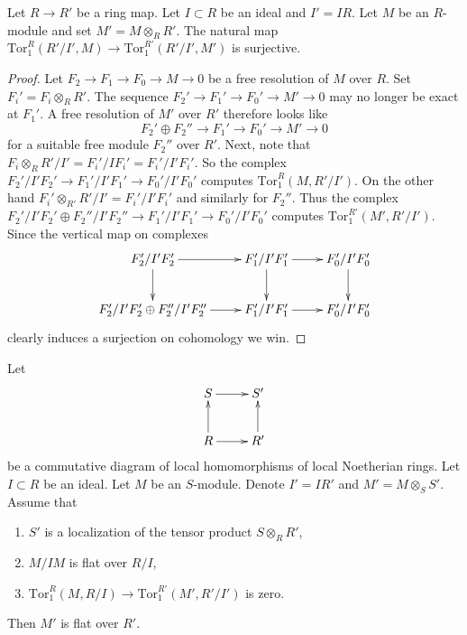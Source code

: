 \begin{lemma}
\label{lemma-surjective-on-tor-one-trivial}
Let $R \to R'$ be a ring map. Let $I \subset R$ be
an ideal and $I' = IR$. Let $M$ be an $R$-module
and set $M' = M \otimes_R R'$. The natural map
$\text{Tor}_1^R(R'/I', M) \to \text{Tor}_1^{R'}(R'/I', M')$
is surjective.
\end{lemma}

\begin{proof}
Let $F_2 \to F_1 \to F_0 \to M \to 0$ be a free resolution of
$M$ over $R$. Set $F_i' = F_i \otimes_R R'$. The sequence
$F_2' \to F_1' \to F_0' \to M' \to 0$ may no longer be exact
at $F_1'$. A free resolution of $M'$ over $R'$ therefore looks
like
$$
F_2' \oplus F_2'' \to F_1' \to F_0' \to M' \to 0
$$
for a suitable free module $F_2''$ over $R'$. Next, note that
$F_i \otimes_R R'/I' = F_i' / IF_i' = F_i'/I'F_i'$.
So the complex $F_2'/I'F_2' \to F_1'/I'F_1' \to F_0'/I'F_0'$
computes $\text{Tor}_1^R(M, R'/I')$. On the other hand
$F_i' \otimes_{R'} R'/I' = F_i'/I'F_i'$ and similarly
for $F_2''$. Thus the complex
$F_2'/I'F_2' \oplus F_2''/I'F_2'' \to F_1'/I'F_1' \to F_0'/I'F_0'$
computes $\text{Tor}_1^{R'}(M', R'/I')$. Since the vertical
map on complexes
$$
\xymatrix{
F_2'/I'F_2' \ar[r] \ar[d] &
F_1'/I'F_1' \ar[r] \ar[d] &
F_0'/I'F_0' \ar[d] \\
F_2'/I'F_2' \oplus F_2''/I'F_2'' \ar[r] &
F_1'/I'F_1' \ar[r] &
F_0'/I'F_0'
}
$$
clearly induces a surjection on cohomology we win.
\end{proof}

\begin{lemma}
\label{lemma-another-variant-local-criterion-flatness}
Let
$$
\xymatrix{
S \ar[r] & S' \\
R \ar[r] \ar[u] & R' \ar[u]
}
$$
be a commutative diagram of local homomorphisms of local Noetherian rings.
Let $I \subset R$ be an ideal. 
Let $M$ be an $S$-module.
Denote $I' = IR'$ and $M' = M\otimes_S S'$.
Assume that
\begin{enumerate}
\item $S'$ is a localization of the tensor product
$S \otimes_R R'$,
\item $M/IM$ is flat over $R/I$,
\item $\text{Tor}_1^R(M, R/I) \to \text{Tor}_1^{R'}(M', R'/I')$
is zero.
\end{enumerate}
Then $M'$ is flat over $R'$.
\end{lemma}

